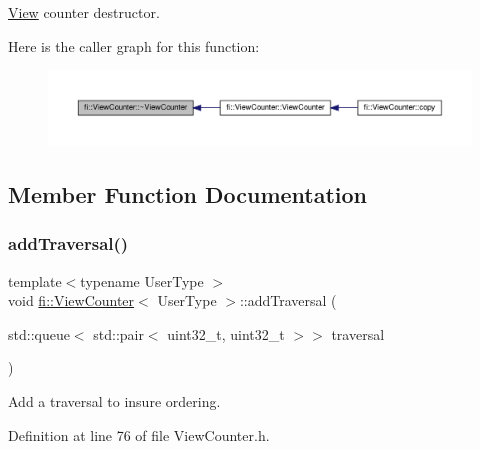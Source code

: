 \hyperlink{classfi_1_1View}{View} counter destructor. 

Here is the caller graph for this function\+:
\nopagebreak
\begin{figure}[H]
\begin{center}
\leavevmode
\includegraphics[width=350pt]{df/dae/classfi_1_1ViewCounter_abc86ae6ba64c6be66d512ab6412ce108_icgraph}
\end{center}
\end{figure}


\subsection{Member Function Documentation}
\mbox{\label{classfi_1_1ViewCounter_ae0c572277d297849a1b2dde6f8e4a521}} 
\subsubsection{\texorpdfstring{add\+Traversal()}{addTraversal()}}
{\footnotesize\ttfamily template$<$typename User\+Type $>$ \\
void \hyperlink{classfi_1_1ViewCounter}{fi\+::\+View\+Counter}$<$ User\+Type $>$\+::add\+Traversal (\begin{DoxyParamCaption}\item[{std\+::queue$<$ std\+::pair$<$ uint32\+\_\+t, uint32\+\_\+t $>$$>$}]{traversal }\end{DoxyParamCaption})\hspace{0.3cm}{\ttfamily [inline]}}



Add a traversal to insure ordering. 



Definition at line 76 of file View\+Counter.\+h.

\mbox{\label{classfi_1_1ViewCounter_a78ffe68387ffe83ce2135c9cd5cac033}} 
